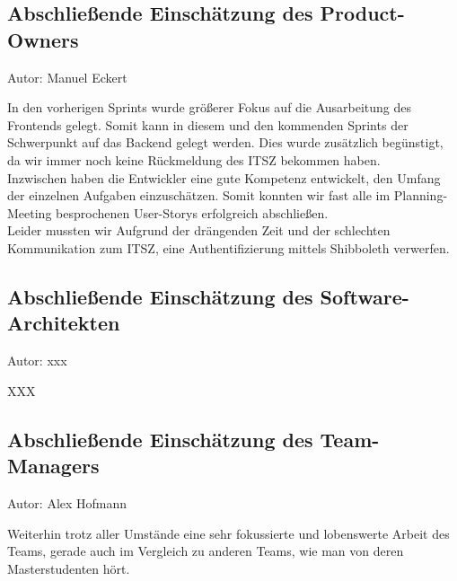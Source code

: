 \subsection{Abschließende Einschätzung des Product-Owners}
{\small Autor: Manuel Eckert}

In den vorherigen Sprints wurde größerer Fokus auf die Ausarbeitung des Frontends gelegt. Somit kann in diesem und den kommenden Sprints der Schwerpunkt auf das Backend gelegt werden. Dies wurde zusätzlich begünstigt, da wir immer noch keine Rückmeldung des ITSZ bekommen haben. \\
Inzwischen haben die Entwickler eine gute Kompetenz entwickelt, den Umfang der einzelnen Aufgaben einzuschätzen. Somit konnten wir fast alle im Planning-Meeting besprochenen User-Storys erfolgreich abschließen. \\
Leider mussten wir Aufgrund der drängenden Zeit und der schlechten Kommunikation zum ITSZ, eine Authentifizierung mittels Shibboleth verwerfen.   

\subsection{Abschließende Einschätzung des Software-Architekten}
{\small Autor: xxx}

XXX

\subsection{Abschließende Einschätzung des Team-Managers}
{\small Autor: Alex Hofmann}

Weiterhin trotz aller Umstände eine sehr fokussierte und lobenswerte Arbeit des Teams, gerade auch im Vergleich zu anderen Teams, wie man von deren Masterstudenten hört.

